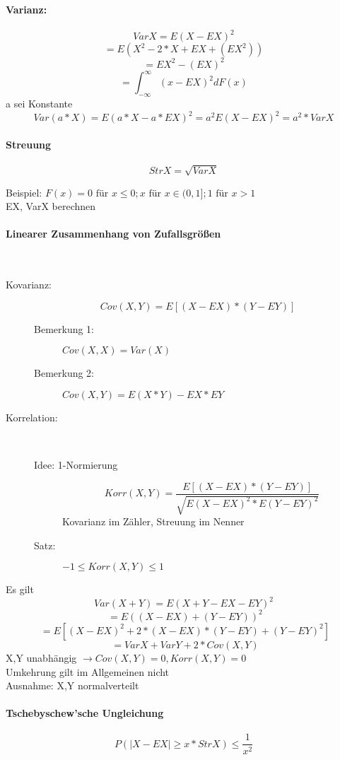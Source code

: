 \documentclass[a4paper,12pt]{scrartcl}
\begin{document}
\paragraph{Varianz:}
$$VarX = E(X-EX)^2$$
$$= E(X^2-2*X +EX +(EX^2))$$
$$= EX^2 - (EX)^2$$
$$= \int^{\infty}_{-\infty}(x-EX)^2 dF(x)$$
a sei Konstante
$$Var(a*X) = E(a*X - a*EX)^2 = a^2E(X-EX)^2=a^2*VarX$$

\paragraph{Streuung}
$$StrX = \sqrt{VarX} $$

Beispiel: $F(x) = 0 \text{ für } x\leq 0; x \text{ für } x\in (0,1]; 1 \text{ für } x>1$\\
EX, VarX berechnen

\paragraph{Linearer Zusammenhang von Zufallsgrößen}\quad\\
\begin{description}
 \item[Kovarianz:] $$Cov(X,Y) = E[(X-EX)*(Y-EY)]$$
 \begin{description}
  \item[Bemerkung 1:] $Cov(X,X)=Var(X) $
  \item[Bemerkung 2:] $Cov(X,Y)=E(X*Y)-EX*EY$
 \end{description}
 \item[Korrelation:]\quad\\
 \begin{description}
  \item[Idee: 1-Normierung]
    $$Korr(X,Y) = \frac{E[(X-EX)*(Y-EY)]}{\sqrt{E(X-EX)^2*E(Y-EY)^2}}$$
    Kovarianz im Zähler, Streuung im Nenner
  \item[Satz:] $-1\leq Korr(X,Y)\leq 1$
 \end{description}
\end{description}

Es gilt
$$Var(X+Y) = E(X+Y - EX-EY)^2$$
$$\; =E((X-EX)+(Y-EY))^2$$
$$\; =E[(X-EX)^2+2*(X-EX)*(Y-EY)+(Y-EY)^2]$$
$$\; =VarX + VarY + 2*Cov(X,Y)$$
X,Y unabhängig $\rightarrow Cov(X,Y)=0, Korr(X,Y)=0$\\
Umkehrung gilt im Allgemeinen nicht\\
Ausnahme: X,Y normalverteilt\\
\paragraph{Tschebyschew'sche Ungleichung}
$$P(|X-EX|\geq x * StrX) \leq \frac{1}{x^2}$$
\end{document}
